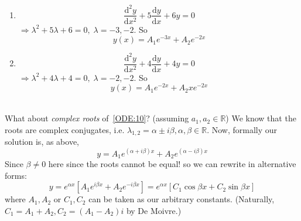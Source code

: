 \documentclass[12pt]{report}
\theoremstyle{definition}
\begin{document}
\begin{ex}
    \;

    \begin{enumerate}
        \item \[
            \frac{\mathrm{d}^{2}y}{\mathrm{d}x^{2}} + 5 \frac{\mathrm{d}y}{\mathrm{d}x} + 6y = 0
        \]
        $\Rightarrow \lambda^{2} + 5 \lambda + 6 = 0, \;\lambda = -3, -2$. So \[
            y(x) = A_1 e ^{-3x} + A_2 e^{-2x}
        \]
        
    \item \[
        \frac{\mathrm{d}^{2}y}{\mathrm{d}x^{2}} + 4\frac{\mathrm{d}y}{\mathrm{d}x} + 4y = 0
    \]
    $\Rightarrow \lambda^{2} + 4\lambda + 4 = 0, \;\lambda = -2, -2$. So\[
        y(x) = A_1 e^{-2x} + A_2 x e^{-2x}
    \]
    \end{enumerate}
\end{ex}

\\What about \emph{complex roots} of \,\eqref{ODE:10}? (assuming $a_1, a_2 \in \mathbb{R}$)
We know that the roots are complex conjugates, i.e. $\lambda_{1,2} = \alpha \pm i\beta, 
\alpha, \beta \in \mathbb{R}$.
Now, formally our solution is, as above, \[
    y = A_1 e^{(\alpha + i\beta)x} + A_2 e^{(\alpha - i\beta)x}
\]Since $\beta \neq 0$ here since the roots cannot be equal! so we can rewrite in alternative forms:\[
    y = e^{\alpha x}\left[A_1 e^{i\beta x} + A_2 e^{-i\beta x}\right] 
    = e^{\alpha x}\left[C_1 \cos{\beta x} + C_2 \sin{\beta x}\right] 
\]
where $A_1, A_2$ or $C_1, C_2$ can be taken as our arbitrary constants.
(Naturally, $C_1 = A_1 + A_2, C_2 = (A_1 - A_2)i$ by De Moivre.)
\end{document}
